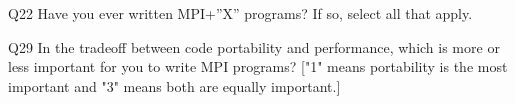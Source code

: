 \begin{description}%
\item{Q22} Have you ever written MPI+”X” programs? If so, select all that apply.%
\item{Q29} In the tradeoff between code portability and performance, which is more or less important for you to write MPI programs? ["1" means portability is the most important and "3" means both are equally important.]%
\end{description}%
